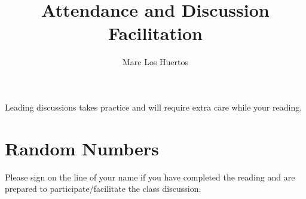 \documentclass{article}\usepackage[]{graphicx}\usepackage[]{color}
\title{Attendance and Discussion Facilitation}
\author{Marc Los Huertos}
\begin{document}
\maketitle

Leading discussions takes practice and will require extra care while your reading. 




\section*{Random Numbers}

Please sign on the line of your name if you have completed the reading and are prepared to participate/facilitate the class discussion. 

\end{document}
